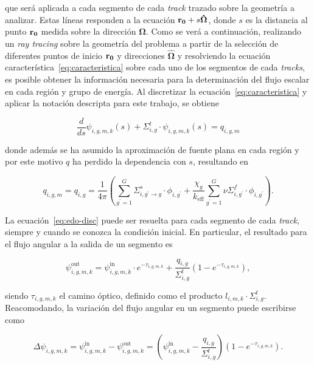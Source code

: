 \documentclass[11pt]{article}
\renewcommand{\vec}[1]{\ensuremath\mathbf{#1}}
\begin{document}
\noindent
que será aplicada a cada segmento de cada \emph{track} trazado sobre la geometría a analizar. Estas líneas responden a la ecuación $\vec{r_0}+s\boldsymbol{\hat{\Omega}}$, donde $s$ es la distancia al punto $\vec{r_0}$ medida sobre la dirección $\boldsymbol{\hat{\Omega}}$. Como se verá a continuación, realizando un \emph{ray tracing} sobre la geometría del problema a partir de la selección de diferentes puntos de inicio $\vec{r_0}$ y direcciones $\boldsymbol{\hat{\Omega}}$ y resolviendo la ecuación característica~\eqref{eq:caracteristica} sobre cada uno de los segmentos de cada \emph{tracks}, es posible obtener la información necesaria para la determinación del flujo escalar en cada región y grupo de energía. Al discretizar la ecuación~\eqref{eq:caracteristica} y aplicar la notación descripta para este trabajo, se obtiene

\begin{equation} \label{eq:edo-disc}
 \frac{d}{ds}\psi_{i,g,m,k} (s)
 + \Sigma^t_{i,g} \cdot \psi_{i,g,m,k} (s) = 
 q_{i,g,m}
\end{equation}

\noindent
donde además se ha asumido la aproximación de fuente plana en cada región y por este motivo $q$ ha perdido la dependencia con $s$, resultando en

\begin{equation} \label{eq:fuente-isotropica}
 q_{i,g,m} = q_{i,g} = 
 \frac{1}{4\pi} \left(
 \sum_{g^\prime=1}^G \Sigma^s_{i,g^\prime \rightarrow g} \cdot \phi_{i,g^\prime}
 + \frac{\chi_g}{k_{\text{eff}}} \sum_{g^\prime=1}^G \nu\Sigma^f_{i,g^\prime} \cdot \phi_{i,g^\prime}
 \right).
\end{equation}

La ecuación~\eqref{eq:edo-disc} puede ser resuelta para cada segmento de cada \emph{track}, siempre y cuando se conozca la condici\'on inicial. En particular, el resultado para el flujo angular a la salida de un segmento es

\begin{equation}
 \psi^{\text{out}}_{i,g,m,k} = \psi^{\text{in}}_{i,g,m,k} \cdot e^{-\tau_{i,g,m,k}}
 + \frac{q_{i,g}}{\Sigma^t_{i,g}} \left(1 - e^{-\tau_{i,g,m,k}} \right),
\end{equation}

\noindent
siendo $\tau_{i,g,m,k}$ el camino óptico, definido como el producto $l_{i,m,k} \cdot \Sigma^t_{i,g}$. Reacomodando, la variación del flujo angular en un segmento puede escribirse como

\begin{equation} \label{eq:delta-psi}
 \Delta \psi_{i,g,m,k} = 
 \psi^{\text{in}}_{i,g,m,k} - \psi^{\text{out}}_{i,g,m,k} = 
 \left( \psi^{\text{in}}_{i,g,m,k} - \frac{q_{i,g}}{\Sigma^t_{i,g}} \right) \left(1 - e^{-\tau_{i,g,m,k}} \right).
\end{equation}
\end{document}
